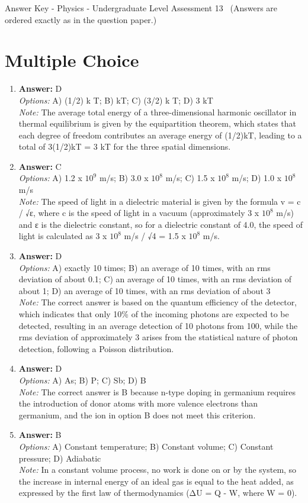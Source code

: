 \documentclass[12pt]{article}
\begin{document}
\begin{center}
Answer Key - Physics - Undergraduate Level Assessment 13 \
\small (Answers are ordered exactly as in the question paper.)
\end{center}

\section*{Multiple Choice}
\begin{enumerate}[label=\arabic*.]
\item \textbf{Answer:} D
\\ \textit{Options:} A) (1/2) k T; B) kT; C) (3/2) k T; D) 3 kT
\\ \textit{Note:} The average total energy of a three-dimensional harmonic oscillator in thermal equilibrium is given by the equipartition theorem, which states that each degree of freedom contributes an average energy of (1/2)kT, leading to a total of 3(1/2)kT = 3 kT for the three spatial dimensions.
\item \textbf{Answer:} C
\\ \textit{Options:} A) 1.2 x $10^9$ m/s; B) 3.0 x $10^8$ m/s; C) 1.5 x $10^8$ m/s; D) 1.0 x $10^8$ m/s
\\ \textit{Note:} The speed of light in a dielectric material is given by the formula v = c / √ε, where c is the speed of light in a vacuum (approximately 3 x $10^8$ m/s) and ε is the dielectric constant, so for a dielectric constant of 4.0, the speed of light is calculated as 3 x $10^8$ m/s / √4 = 1.5 x $10^8$ m/s.
\item \textbf{Answer:} D
\\ \textit{Options:} A) exactly 10 times; B) an average of 10 times, with an rms deviation of about 0.1; C) an average of 10 times, with an rms deviation of about 1; D) an average of 10 times, with an rms deviation of about 3
\\ \textit{Note:} The correct answer is based on the quantum efficiency of the detector, which indicates that only 10\% of the incoming photons are expected to be detected, resulting in an average detection of 10 photons from 100, while the rms deviation of approximately 3 arises from the statistical nature of photon detection, following a Poisson distribution.
\item \textbf{Answer:} D
\\ \textit{Options:} A) As; B) P; C) Sb; D) B
\\ \textit{Note:} The correct answer is B because n-type doping in germanium requires the introduction of donor atoms with more valence electrons than germanium, and the ion in option B does not meet this criterion.
\item \textbf{Answer:} B
\\ \textit{Options:} A) Constant temperature; B) Constant volume; C) Constant pressure; D) Adiabatic
\\ \textit{Note:} In a constant volume process, no work is done on or by the system, so the increase in internal energy of an ideal gas is equal to the heat added, as expressed by the first law of thermodynamics (ΔU = Q - W, where W = 0).
\end{enumerate}
\end{document}
